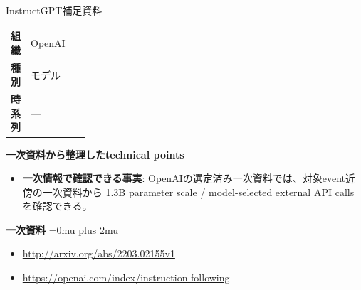 \begin{technicalnote}{InstructGPT}{補足資料}
\begingroup
\begin{tabularx}{\linewidth}{@{}>{\bfseries}p{0.22\linewidth}X@{}}
組織 & OpenAI \\
種別 & モデル \\
時系列 & — \\
\end{tabularx}
\smallskip
{\bfseries 一次資料から整理したtechnical points}
\begin{itemize}[leftmargin=1.5em,itemsep=0.35em]
\item \textbf{一次情報で確認できる事実}: OpenAIの選定済み一次資料では、対象event近傍の一次資料から 1.3B parameter scale / model-selected external API calls を確認できる。
\end{itemize}
\begin{minipage}{\linewidth}
\begin{samepage}
{\bfseries 一次資料}
\begingroup\sloppy
\Urlmuskip=0mu plus 2mu\relax
\begin{itemize}[leftmargin=1.5em,itemsep=0.25em]
\item {\scriptsize\url{http://arxiv.org/abs/2203.02155v1}}
\item {\scriptsize\url{https://openai.com/index/instruction-following}}
\end{itemize}
\endgroup
\end{samepage}
\end{minipage}
\endgroup
\end{technicalnote}
\medskip

